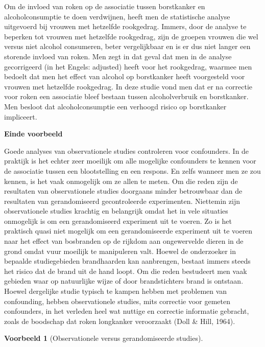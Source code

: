 \documentclass[
  12pt,dutch,coursenotes]{book}
\theoremstyle{definition}
\theoremstyle{definition}
\newtheorem{example}{Voorbeeld}[chapter]
\theoremstyle{definition}
\theoremstyle{remark}
\begin{document}
Om de invloed van roken op de associatie tussen borstkanker en
alcoholconsumptie te doen verdwijnen, heeft men de statistische analyse
uitgevoerd bij vrouwen met hetzelfde rookgedrag. Immers, door de analyse te
beperken tot vrouwen met hetzelfde rookgedrag, zijn de groepen vrouwen die
wel versus niet alcohol consumeren, beter vergelijkbaar en is er dus niet
langer een storende invloed van roken. Men zegt in dat geval dat men in de
analyse gecorrigeerd (in het Engels: adjusted) heeft voor het
rookgedrag, waarmee men bedoelt dat men het effect van alcohol op
borstkanker heeft voorgesteld voor vrouwen met hetzelfde rookgedrag. In deze
studie vond men dat er na correctie voor roken een associatie bleef bestaan
tussen alcoholverbruik en borstkanker. Men besloot dat alcoholconsumptie een
verhoogd risico op borstkanker impliceert.

\textbf{Einde voorbeeld}

Goede analyses van observationele studies controleren voor confounders. In
de praktijk is het echter zeer moeilijk om alle mogelijke confounders te
kennen voor de associatie tussen een blootstelling en een respons. En zelfs
wanneer men ze zou kennen, is het vaak onmogelijk om ze allen te meten. Om
die reden zijn de resultaten van observationele studies doorgaans minder
betrouwbaar dan de resultaten van gerandomiseerd gecontroleerde
experimenten. Niettemin zijn observationele studies krachtig en belangrijk
omdat het in vele situaties onmogelijk is om een gerandomiseerd experiment
uit te voeren. Zo is het praktisch quasi niet mogelijk om een
gerandomiseerde experiment uit te voeren naar het effect van bosbranden op de rijkdom aan ongewervelde dieren in de grond omdat vuur moeilijk te manipuleren valt. Hoewel de onderzoeker in bepaalde studiegebieden brandhaarden kan aanbrengen, bestaat immers steeds het risico dat de brand uit de hand loopt. Om die reden bestudeert men vaak gebieden waar op natuurlijke wijze of door brandstichters brand is ontstaan. Hoewel dergelijke studie typisch te kampen hebben met problemen van confounding, hebben observationele studies, mits correctie
voor gemeten confounders, in het verleden heel wat nuttige en correctie informatie gebracht, zoals de boodschap dat roken longkanker veroorzaakt (Doll \& Hill, 1964).

\begin{example}[Observationele versus gerandomiseerde studies]
\protect\hypertarget{exm:unnamed-chunk-84}{}{\label{exm:unnamed-chunk-84} \iffalse (Observationele versus gerandomiseerde studies) \fi{} }
\end{example}
\end{document}
